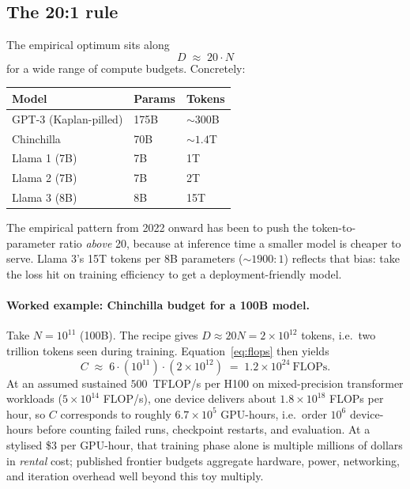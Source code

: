 \subsection{The 20:1 rule}

The empirical optimum sits along
\begin{equation}
  D \;\approx\; 20 \cdot N
\end{equation}
for a wide range of compute budgets. Concretely:

\begin{center}
\begin{tabular}{lll}
\toprule
Model & Params & Tokens \\
\midrule
GPT-3 (Kaplan-pilled) & 175B & ${\sim}300$B \\
Chinchilla            & 70B  & ${\sim}1.4$T \\
Llama 1 (7B)          & 7B   & 1T \\
Llama 2 (7B)          & 7B   & 2T \\
Llama 3 (8B)          & 8B   & 15T \\
\bottomrule
\end{tabular}
\end{center}

The empirical pattern from 2022 onward has been to push the
token-to-parameter ratio \emph{above} 20, because at inference time a
smaller model is cheaper to serve. Llama 3's 15T tokens per 8B parameters
(${\sim}1900{:}1$) reflects that bias: take the loss hit on training
efficiency to get a deployment-friendly model.

\paragraph{Worked example: Chinchilla budget for a 100B model.}
Take \(N = 10^{11}\) (100B). The recipe gives \(D \approx 20 N
= 2\times 10^{12}\) tokens, i.e.\ two trillion tokens seen during
training. Equation~\eqref{eq:flops} then yields
\[
  C \;\approx\; 6 \cdot (10^{11}) \cdot (2\times 10^{12})
  \;=\; 1.2\times 10^{24}\ \text{FLOPs}.
\]
At an assumed sustained \(500\)~TFLOP/s per H100 on mixed-precision
transformer workloads (\(5\times 10^{14}\) FLOP/s), one device delivers
about \(1.8\times 10^{18}\) FLOPs per hour, so \(C\) corresponds to
roughly \(6.7\times 10^{5}\) GPU-hours, i.e.\ order \(10^{6}\) device-hours
before counting failed runs, checkpoint restarts, and evaluation. At a
stylised \$3 per GPU-hour, that training phase alone is multiple millions
of dollars in \emph{rental} cost; published frontier budgets aggregate
hardware, power, networking, and iteration overhead well beyond this toy
multiply.

